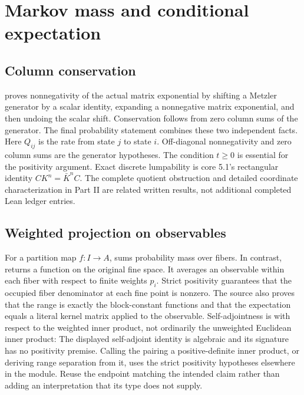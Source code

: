 \clearpage\section{Markov mass and conditional expectation}
\label{sec:probability}
\subsection{Column conservation}
 proves nonnegativity of the actual matrix exponential by shifting a Metzler generator by a scalar identity, expanding a nonnegative matrix exponential, and then undoing the scalar shift. Conservation follows from zero column sums of the generator. The final probability statement combines these two independent facts.
Here $Q_{ij}$ is the rate from state $j$ to state $i$. Off-diagonal nonnegativity and zero column sums are the generator hypotheses. The condition $t\ge0$ is essential for the positivity argument. Exact discrete lumpability is core 5.1's rectangular identity $CK^n=\bar K^nC$. The complete quotient obstruction and detailed coordinate characterization in Part II are related written results, not additional completed Lean ledger entries.

\subsection{Weighted projection on observables}
For a partition map $f:I\to A$,  sums probability mass over fibers. In contrast,  returns a function on the original fine space. It averages an observable within each fiber with respect to finite weights $p_i$. Strict positivity guarantees that the occupied fiber denominator at each fine point is nonzero.
The source also proves that the range is exactly the block-constant functions and that the expectation equals a literal kernel matrix applied to the observable. Self-adjointness is with respect to the weighted inner product, not ordinarily the unweighted Euclidean inner product:
The displayed self-adjoint identity is algebraic and its signature has no positivity premise. Calling the pairing a positive-definite inner product, or deriving range separation from it, uses the strict positivity hypotheses elsewhere in the module. Reuse the endpoint matching the intended claim rather than adding an interpretation that its type does not supply.

